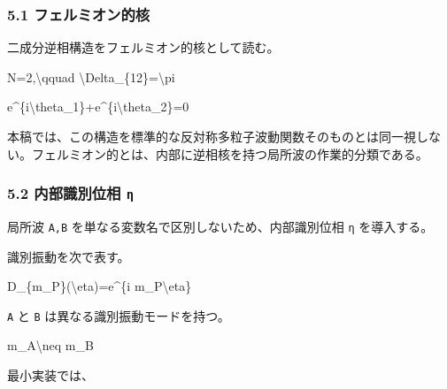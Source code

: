\documentclass[
  a4paper,
]{article}
\newenvironment{Shaded}{}{}
\newcommand{\NormalTok}[1]{#1}
\begin{document}
\subsubsection{5.1
フェルミオン的核}\label{ux30d5ux30a7ux30ebux30dfux30aaux30f3ux7684ux6838}

二成分逆相構造をフェルミオン的核として読む。

\begin{Shaded}
\begin{Highlighting}[]
\NormalTok{N=2,\textbackslash{}qquad \textbackslash{}Delta\_\{12\}=\textbackslash{}pi}
\end{Highlighting}
\end{Shaded}

\begin{Shaded}
\begin{Highlighting}[]
\NormalTok{e\^{}\{i\textbackslash{}theta\_1\}+e\^{}\{i\textbackslash{}theta\_2\}=0}
\end{Highlighting}
\end{Shaded}

本稿では、この構造を標準的な反対称多粒子波動関数そのものとは同一視しない。フェルミオン的とは、内部に逆相核を持つ局所波の作業的分類である。

\subsubsection{\texorpdfstring{5.2 内部識別位相
\texttt{η}}{5.2 内部識別位相 η}}\label{ux5185ux90e8ux8b58ux5225ux4f4dux76f8-ux3b7}

局所波 \texttt{A,B} を単なる変数名で区別しないため、内部識別位相
\texttt{η} を導入する。

識別振動を次で表す。

\begin{Shaded}
\begin{Highlighting}[]
\NormalTok{D\_\{m\_P\}(\textbackslash{}eta)=e\^{}\{i m\_P\textbackslash{}eta\}}
\end{Highlighting}
\end{Shaded}

\texttt{A} と \texttt{B} は異なる識別振動モードを持つ。

\begin{Shaded}
\begin{Highlighting}[]
\NormalTok{m\_A\textbackslash{}neq m\_B}
\end{Highlighting}
\end{Shaded}

最小実装では、
\end{document}
